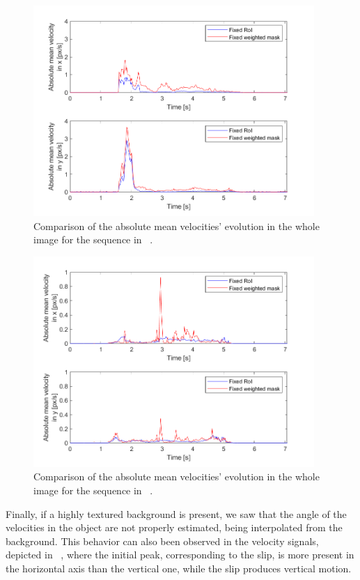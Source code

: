 \begin{figure}[H]
    \centering
    \includegraphics[width=0.95\textwidth]{resources/images/OF_comparison_set_rev}
    \caption{Comparison of the absolute mean velocities' evolution in the whole image for the sequence in ~.}\label{fig:OF_comparison_set_rev}
\end{figure}

\begin{figure}[H]
    \centering
    \includegraphics[width=0.95\textwidth]{resources/images/OF_comparison_hb1}
    \caption{Comparison of the absolute mean velocities' evolution in the whole image for the sequence in ~.}\label{fig:OF_comparison_hb1}
\end{figure}

Finally, if a highly textured background is present, we saw that the angle of the velocities in the object are not properly estimated, being interpolated from the background. This behavior can also been observed in the velocity signals, depicted in ~, where the initial peak, corresponding to the slip, is more present in the horizontal axis than the vertical one, while the slip produces vertical motion.


